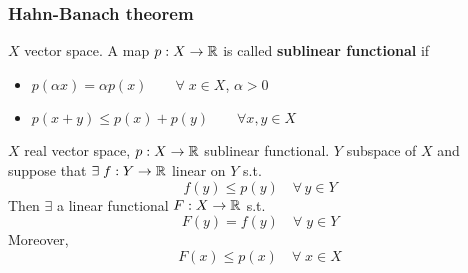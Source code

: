 \subsubsection{Hahn-Banach theorem}

\begin{definition}
    \(X\) vector space. A map \(p: X \to \mathbb{R}\) is called \textbf{sublinear functional} if 
    \begin{itemize}
        \item \(p(\alpha x) = \alpha p(x) \qquad \forall \; x \in X\), \(\alpha >0\)
        \item \(p(x+y) \leq p(x) + p(y) \qquad \forall x, y \in X\)  
    \end{itemize}
\end{definition}

\begin{theorem}
    \(X\) real vector space, \(p: X \to \mathbb{R}\) sublinear functional. 
    \(Y\) subspace of \(X\) and suppose that \(\exists \; f: Y \to \mathbb{R} \) linear on \(Y\) s.t. 
    \[
        f(y) \leq p(y) \quad \forall \, y \in Y
    \]
    Then \(\exists\) a linear functional \(F: X \to \mathbb{R} \) s.t. 
    \[
        F(y) = f(y) \quad \forall \; y \in Y \tag*{\(F\) is an extension of \(f\)}
    \]
    Moreover,
    \[
        F(x) \leq p(x) \quad \forall \; x \in X
    \] 
\end{theorem}

